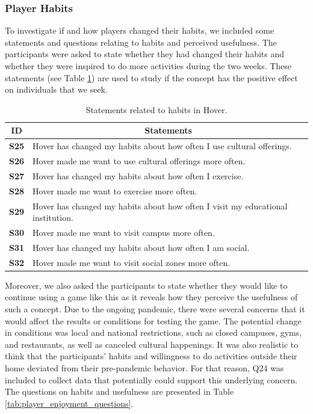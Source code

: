 \subsubsection{Player Habits}
To investigate if and how players changed their habits, we included some statements and questions relating to habits and perceived usefulness. The participants were asked to state whether they had changed their habits and whether they were inspired to do more activities during the two weeks. These statements (see Table \ref{tab:player_habits_statements}) are used to study if the concept has the positive effect on individuals that we seek.

\begin{table}[H]
    \centering
    \begin{tabularx}{0.95\textwidth}{|c|X|}
        \hline
        \textbf{ID} & \multicolumn{1}{c|}{\textbf{Statements}} \\ \hline
        \textbf{S25} & Hover has changed my habits about how often I use cultural offerings. \\
        \textbf{S26} & Hover made me want to use cultural offerings more often.\\
        \textbf{S27} & Hover has changed my habits about how often I exercise. \\
        \textbf{S28} & Hover made me want to exercise more often. \\ 
        \textbf{S29} & Hover has changed my habits about how often I visit my educational institution. \\
        \textbf{S30} & Hover made me want to visit campus more often. \\
        \textbf{S31} & Hover has changed my habits about how often I am social. \\ 
        \textbf{S32} &  Hover made me want to visit social zones more often.\\ \hline
    \end{tabularx}
    \caption{Statements related to habits in Hover.}
    \label{tab:player_habits_statements}
\end{table}

Moreover, we also asked the participants to state whether they would like to continue using a game like this as it reveals how they perceive the usefulness of such a concept. Due to the ongoing pandemic, there were several concerns that it would affect the results or conditions for testing the game. The potential change in conditions was local and national restrictions, such as closed campuses, gyms, and restaurants, as well as canceled cultural happenings. It was also realistic to think that the participants' habits and willingness to do activities outside their home deviated from their pre-pandemic behavior. For that reason, Q24 was included to collect data that potentially could support this underlying concern. The questions on habits and usefulness are presented in Table \ref{tab:player_enjoyment_questions}.

